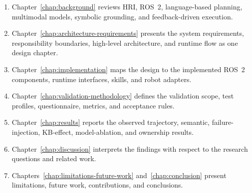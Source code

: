 \begin{enumerate}
  \item Chapter~\ref{chap:background} reviews HRI, ROS~2, language-based planning, multimodal models, symbolic grounding, and feedback-driven execution.
  \item Chapter~\ref{chap:architecture-requirements} presents the system requirements, responsibility boundaries, high-level architecture, and runtime flow as one design chapter.
  \item Chapter~\ref{chap:implementation} maps the design to the implemented ROS~2 components, runtime interfaces, skills, and robot adapters.
  \item Chapter~\ref{chap:validation-methodology} defines the validation scope, test profiles, questionnaire, metrics, and acceptance rules.
  \item Chapter~\ref{chap:results} reports the observed trajectory, semantic, failure-injection, KB-effect, model-ablation, and ownership results.
  \item Chapter~\ref{chap:discussion} interprets the findings with respect to the research questions and related work.
  \item Chapters~\ref{chap:limitations-future-work} and~\ref{chap:conclusion} present limitations, future work, contributions, and conclusions.
\end{enumerate}

